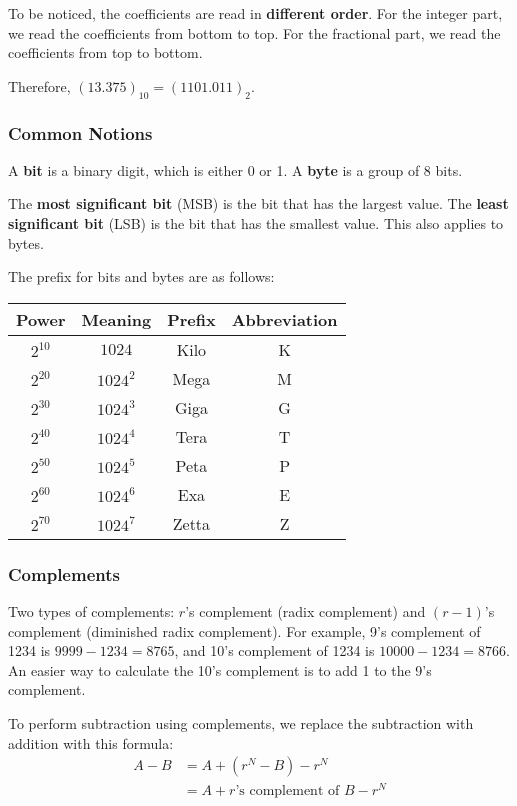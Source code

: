 \documentclass[a4paper,12pt]{article}
\begin{document}
To be noticed, the coefficients are read in \textbf{different order}.
For the integer part, we read the coefficients from bottom to top.
For the fractional part, we read the coefficients from top to bottom.

Therefore, $(13.375)_{10} = (1101.011)_2$.

\subsubsection{Common Notions}

A \textbf{bit} is a binary digit, which is either 0 or 1.
A \textbf{byte} is a group of 8 bits.

The \textbf{most significant bit} (MSB) is the bit that has the largest value.
The \textbf{least significant bit} (LSB) is the bit that has the smallest value.
This also applies to bytes.

The prefix for bits and bytes are as follows:
\begin{center}
	\begin{tabular}{cccc}
		\toprule
		Power & Meaning & Prefix & Abbreviation \\
		\midrule
		$2^{10}$ & $1024$ & Kilo & K \\
		$2^{20}$ & $1024^{2}$ & Mega & M \\
		$2^{30}$ & $1024^{3}$ & Giga & G \\
		$2^{40}$ & $1024^{4}$ & Tera & T \\
		$2^{50}$ & $1024^{5}$ & Peta & P \\
		$2^{60}$ & $1024^{6}$ & Exa & E \\
		$2^{70}$ & $1024^{7}$ & Zetta & Z \\
		\bottomrule
	\end{tabular}
\end{center}

\subsubsection{Complements}

Two types of complements: $r$'s complement (radix complement) and $(r-1)$'s complement (diminished radix complement).
For example, 9's complement of 1234 is $9999 - 1234 = 8765$, and 10's complement of 1234 is $10000 - 1234 = 8766$.
An easier way to calculate the 10's complement is to add 1 to the 9's complement.

To perform subtraction using complements, we replace the subtraction with addition with this formula:
\begin{align*}
	A - B &= A + (r^N - B) - r^N \\
	&= A + r\text{'s complement of }B - r^N
\end{align*}
\end{document}
